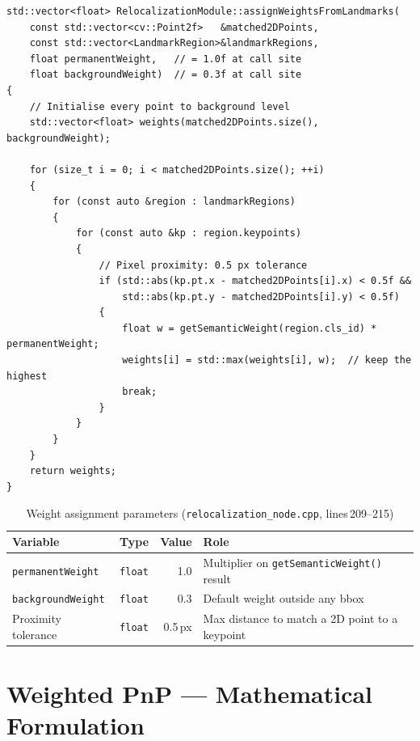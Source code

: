 \documentclass[12pt,a4paper]{article}
\begin{document}
\begin{lstlisting}[style=cpp,
  caption={\texttt{assignWeightsFromLandmarks()} ---
           \texttt{relocalization.cpp}, lines\,1170--1194}]
std::vector<float> RelocalizationModule::assignWeightsFromLandmarks(
    const std::vector<cv::Point2f>   &matched2DPoints,
    const std::vector<LandmarkRegion>&landmarkRegions,
    float permanentWeight,   // = 1.0f at call site
    float backgroundWeight)  // = 0.3f at call site
{
    // Initialise every point to background level
    std::vector<float> weights(matched2DPoints.size(), backgroundWeight);

    for (size_t i = 0; i < matched2DPoints.size(); ++i)
    {
        for (const auto &region : landmarkRegions)
        {
            for (const auto &kp : region.keypoints)
            {
                // Pixel proximity: 0.5 px tolerance
                if (std::abs(kp.pt.x - matched2DPoints[i].x) < 0.5f &&
                    std::abs(kp.pt.y - matched2DPoints[i].y) < 0.5f)
                {
                    float w = getSemanticWeight(region.cls_id) * permanentWeight;
                    weights[i] = std::max(weights[i], w);  // keep the highest
                    break;
                }
            }
        }
    }
    return weights;
}
\end{lstlisting}

\begin{table}[H]
\centering
\caption{Weight assignment parameters
         (\texttt{relocalization\_node.cpp}, lines\,209--215)}
\begin{tabular}{llrl}
\toprule
Variable & Type & Value & Role \\
\midrule
\texttt{permanentWeight}  & \texttt{float} & 1.0 & Multiplier on \texttt{getSemanticWeight()} result \\
\texttt{backgroundWeight} & \texttt{float} & 0.3 & Default weight outside any bbox \\
Proximity tolerance       & \texttt{float} & 0.5\,px & Max distance to match a 2D point to a keypoint \\
\bottomrule
\end{tabular}
\end{table}

\section{Weighted PnP --- Mathematical Formulation}
\end{document}
